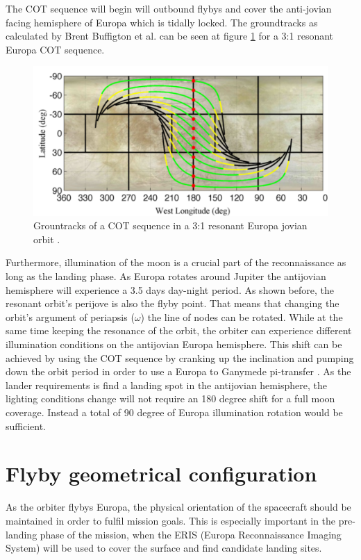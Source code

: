 The COT sequence will begin will outbound flybys and cover the anti-jovian facing hemisphere of Europa which is tidally locked. The groundtracks as calculated by Brent Buffigton et al. \cite{cotseq} can be seen at figure \ref{fig:ground_tr} for a 3:1 resonant Europa COT sequence.

\begin{figure}[htb!]
\centering
\includegraphics[scale=0.3]{figures/Orbiter/groundtr.png}
\caption{Grountracks of a COT sequence in a 3:1 resonant Europa jovian orbit \cite{cotseq}.}
\label{fig:ground_tr}
\end{figure}

Furthermore, illumination of the moon is a crucial part of the reconnaissance as long as the landing phase. As Europa rotates around Jupiter the antijovian hemisphere will experience a 3.5 days day-night period. As shown before, the resonant orbit's perijove is also the flyby point. That means that changing the orbit's argument of periapsis ($\omega$) the line of nodes can be rotated. While at the same time keeping the resonance of the orbit, the orbiter can experience different illumination conditions on the antijovian Europa hemisphere. This shift can be achieved by using the COT sequence by cranking up the inclination and pumping down the orbit period in order to use a Europa to Ganymede pi-transfer \cite{cotseq}. As the lander requirements is find a landing spot in the antijovian hemisphere, the lighting conditions change will not require an 180 degree shift for a full moon coverage. Instead a total of 90 degree of Europa illumination rotation would be sufficient.  
\section{Flyby geometrical configuration}
As the orbiter flybys Europa, the physical orientation of the spacecraft should be maintained in order to fulfil mission goals. This is especially important in the pre-landing phase of the mission, when the ERIS (Europa Reconnaissance Imaging System) will be used to cover the surface and find candidate landing sites. 

